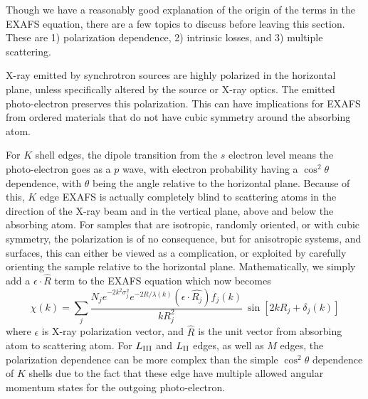 Though we have a reasonably good explanation of the origin of the terms in
the EXAFS equation, there are a few topics to discuss before leaving this
section.  These are 1) polarization dependence, 2) intrinsic losses, and
3) multiple scattering.

X-ray emitted by synchrotron sources are highly polarized in the horizontal
plane, unless specifically altered by the source or X-ray optics.   The
emitted photo-electron preserves this polarization.  This can have
implications for EXAFS from ordered materials that do not have cubic
symmetry around the absorbing atom.

For $K$ shell edges, the dipole transition from the $s$ electron level means
the photo-electron goes as a $p$ wave, with electron probability having a
$\cos^2\theta$ dependence, with $\theta$ being the angle relative to the
horizontal plane.   Because of this, $K$ edge EXAFS is actually completely
blind to scattering atoms in the direction of the X-ray beam and  in the
vertical plane, above and below the absorbing atom.   For samples that are
isotropic, randomly oriented, or with cubic symmetry, the polarization is
of no consequence, but for anisotropic systems, and surfaces, this can
either be viewed as a complication, or exploited by carefully orienting the
sample relative to the horizontal plane.  Mathematically, we simply add
a $\epsilon \cdot \hat{R}$ term to the EXAFS equation which now becomes
\begin{equation}
  \chi(k) = \sum_j {
    {{ \frac{N_j e^{-2k^2\sigma_j^2}
          e^{-2R/\lambda(k)}(\epsilon \cdot \hat{R_j}) f_j(k) }{kR_j^2}}}\>
      \sin[2kR_j + \delta_j(k)] }
      \label{Eq:xafs_withpolar}
\end{equation}
\noindent
where $\epsilon$ is X-ray polarization vector, and $\hat{R}$ is the unit vector from
absorbing atom to scattering atom.  For  $L_{\rm{III}}$ and $L_{\rm{ II}}$
edges, as well as $M$ edges, the polarization dependence can be more
complex than the simple $\cos^2\theta$ dependence of $K$ shells due to the
fact that these edge have multiple allowed angular momentum states for the
outgoing photo-electron.

